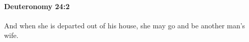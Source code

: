 
		\paragraph{Deuteronomy 24:2} %
			\label{DEUTERONOMY-24-2}

			And when she is departed out of his house, she may go and be another man's wife.


